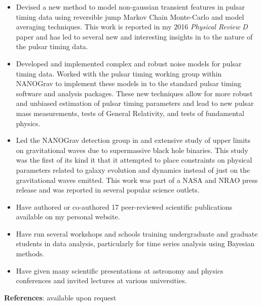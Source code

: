 \documentclass[11pt,letterpaper,sans]{moderncv} %
\begin{document}
\begin{itemize}

\item Devised a new method to model non-gaussian transient features in pulsar timing data using reversible jump Markov Chain Monte-Carlo and model averaging techniques. This work is reported in my 2016 \emph{Physical Review D} paper and has led to several new and interesting insights in to the nature of the pulsar timing data.
\vspace{6pt}

\item Developed and implemented complex and robust noise models for pulsar timing data. Worked with the pulsar timing working group within NANOGrav to implement these models in to the standard pulsar timing software and analysis packages. These new techniques allow for more robust and unbiased estimation of pulsar timing parameters and lead to new pulsar mass measurements, tests of General Relativity, and tests of fundamental physics.
\vspace{6pt}

\item Led the NANOGrav detection group in and extensive study of upper limits on gravitational waves due to supermassive black hole binaries. This study was the first of its kind it that it attempted to place constraints on physical parameters related to galaxy evolution and dynamics instead of just on the gravitational waves emitted. This work was part of a NASA and NRAO press release and was reported in several popular science outlets.
\vspace{6pt}

\item Have authored or co-authored 17 peer-reviewed scientific publications available on my personal website.
\vspace{6pt}

\item Have run several workshops and schools training undergraduate and graduate students in data analysis, particularly for time series analysis using Bayesian methods.
\vspace{6pt}

\item Have given many scientific presentations at astronomy and physics conferences and invited lectures at various universities. 

\end{itemize}

\vspace{15pt}
{\Large\textbf{References}:} available upon request
\end{document}

